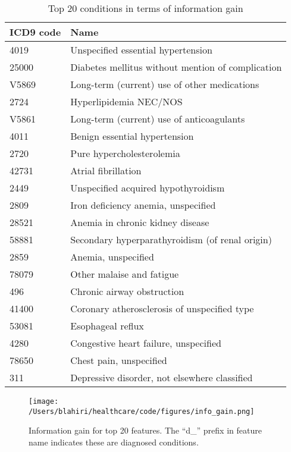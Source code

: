 \begin{table}[ht]
\caption{Top 20 conditions in terms of information gain}
\begin{tabular}{ll}
\hline
ICD9 code & Name\\
\hline
4019 & Unspecified essential hypertension\\
25000 & Diabetes mellitus without mention of complication\\
V5869 & Long-term (current) use of other medications\\
2724 & Hyperlipidemia NEC/NOS\\
V5861 & Long-term (current) use of anticoagulants\\
4011 & Benign essential hypertension\\
2720 & Pure hypercholesterolemia\\
42731 & Atrial fibrillation\\
2449 & Unspecified acquired hypothyroidism\\
2809 & Iron deficiency anemia, unspecified\\
28521 & Anemia in chronic kidney disease\\
58881 & Secondary hyperparathyroidism (of renal origin)\\
2859 & Anemia, unspecified\\
78079 & Other malaise and fatigue\\
496 & Chronic airway obstruction\\
41400 & Coronary atherosclerosis of unspecified type\\
53081 & Esophageal reflux\\
4280 & Congestive heart failure, unspecified\\
78650 & Chest pain, unspecified\\
311 & Depressive disorder, not elsewhere classified\\
\hline
\end{tabular}
\label{tab:top_conditions}
\end{table}

\begin{figure}[!h]
    \centering
    \texttt{[image: /Users/blahiri/healthcare/code/figures/info\_gain.png]}
    \caption{\small Information gain for top 20 features. The ``d\_'' prefix in feature name indicates these are diagnosed conditions.}
    \label{fig:info_gain}
\end{figure}
 
